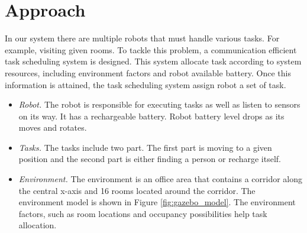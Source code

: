\chapter{Approach}


In our system there are multiple robots that must handle various tasks. For example, visiting given rooms. To tackle this problem, a communication efficient task scheduling system is designed. 
This system allocate task according to system resources, including environment factors and robot available battery. Once this information is attained, the task scheduling system assign robot a set of task.
\begin{itemize}
	\item \textsl{Robot.} The robot is responsible for executing tasks as well as listen to sensors on its way. It has a rechargeable battery. Robot battery level drops as its moves and rotates.
	\item \textsl{Tasks.} The tasks include two part. The first part is moving to a given position and the second part is either finding a person or recharge itself.
	\item \textsl{Environment.} The environment is an office area that contains a corridor along the central x-axis and 16 rooms located around the corridor. The environment model is shown in Figure \ref{fig:gazebo_model}. The environment factors, such as room locations and occupancy possibilities help task allocation.
\end{itemize}


